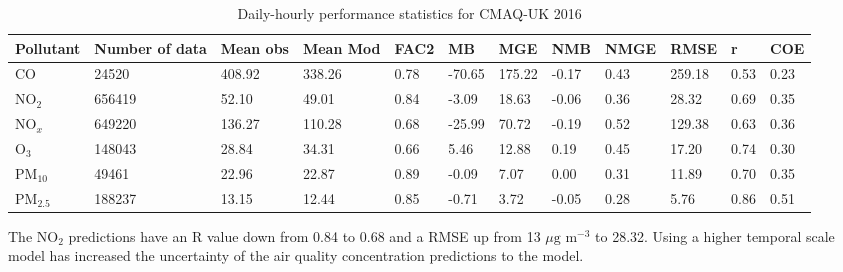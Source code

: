 \begin{table}[H]
\scriptsize
\centering
\begin{tabular}{|p{1cm}|p{1cm}|p{0.8cm}|p{1cm}|p{0.6cm}|p{1cm}|p{1cm}|p{0.8cm}|p{0.8cm}|p{0.8cm}|p{0.6cm}|p{0.7cm}|}
\hline
\textbf{Pollutant} & \textbf{Number of data} & \textbf{Mean obs} & \textbf{Mean Mod} & \textbf{FAC2} & \textbf{MB} & \textbf{MGE} & \textbf{NMB} & \textbf{NMGE} & \textbf{RMSE} & \textbf{r} & \textbf{COE} \\ \hline
CO         & 24520  & 408.92 & 338.26 & 0.78 & -70.65 & 175.22 & -0.17  & 0.43 & 259.18 & 0.53 & 0.23  \\ \hline
NO$_{2}$   & 656419 & 52.10  & 49.01  & 0.84 & -3.09  & 18.63  & -0.06  & 0.36 & 28.32  & 0.69 & 0.35  \\ \hline
NO$_{x}$   & 649220 & 136.27 & 110.28 & 0.68 & -25.99 & 70.72  & -0.19  & 0.52 & 129.38 & 0.63 & 0.36   \\ \hline
O$_{3}$    & 148043 & 28.84  & 34.31  & 0.66 & 5.46   & 12.88  &  0.19  & 0.45 & 17.20  & 0.74 & 0.30   \\ \hline
PM$_{10}$  & 49461  & 22.96  & 22.87  & 0.89 & -0.09  & 7.07   &  0.00  & 0.31 & 11.89  & 0.70 & 0.35   \\ \hline
PM$_{2.5}$ & 188237 & 13.15  & 12.44  & 0.85 & -0.71  & 3.72   &  -0.05 & 0.28 & 5.76   & 0.86 & 0.51  \\ \hline
\end{tabular}
\caption{Daily-hourly performance statistics for CMAQ-UK 2016}
\label{tab:cmaq_performance_stats_2016_hourly}
\end{table}

The NO$_{2}$ predictions have an R value down from 0.84 to 0.68 and a RMSE up from 13 $\mu \text{g m}^{-3}$ to 28.32. Using a higher temporal scale model has increased the uncertainty of the air quality concentration predictions to the model.

